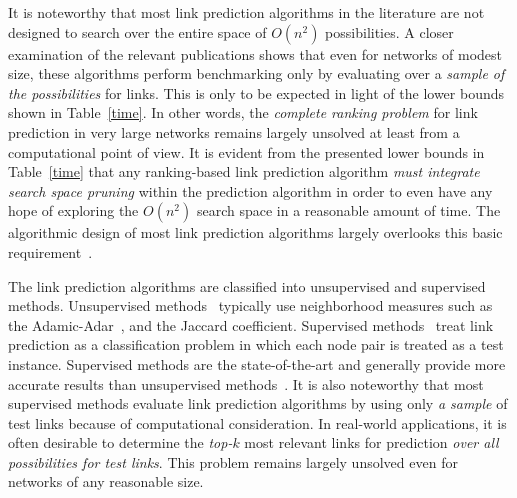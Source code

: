 \documentclass[10pt,journal,compsoc]{IEEEtran}
\newcounter{ccc}
\begin{document}



It is noteworthy that most link prediction algorithms in the
literature are not designed to search over the entire space of
$O(n^2)$ possibilities. A closer examination of the relevant
publications shows that even for networks of modest size, these
algorithms perform benchmarking  only by evaluating over a {\em
sample of the possibilities} for links. This is only to be expected
in light of the lower bounds shown in Table~\ref{time}.  In other
words, the {\em complete ranking problem} for link prediction in
very large networks remains largely unsolved at least from a
computational point of view. It is evident from the presented lower
bounds in Table~\ref{time} that any ranking-based link prediction
algorithm {\em must integrate search space pruning} within the
prediction algorithm in order to even  have any  hope of exploring
the $O(n^2)$ search space in a reasonable amount of time. The
algorithmic design of most link prediction algorithms largely
overlooks this basic requirement~\cite{chancc,propflow}.

The link prediction algorithms are classified into unsupervised and
supervised methods. Unsupervised methods~\cite{kleinberg} typically
use neighborhood measures such as the Adamic-Adar~\cite{adamic}, and
the Jaccard coefficient. Supervised methods~\cite{propflow} treat
link prediction as a classification problem in which each node pair
is treated as a test instance. Supervised methods are the
state-of-the-art and generally provide more accurate results than
unsupervised methods~\cite{propflow}. It is also noteworthy that
most supervised methods evaluate link prediction algorithms by using
only {\em a sample} of test links because of computational
consideration.  In real-world applications, it is often desirable to
determine the {\em top-$k$} most relevant links for prediction {\em
over all possibilities for test links}. This problem remains largely
unsolved even for networks of any reasonable size.
\end{document}
